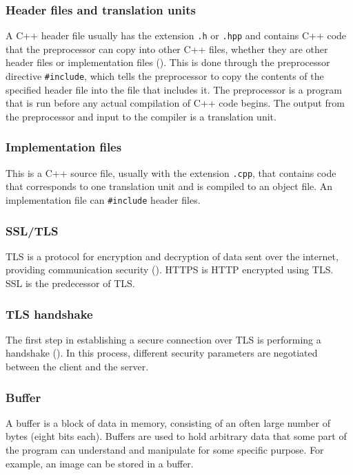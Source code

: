 \documentclass[12pt, a4paper]{article}
\begin{document}
\subsubsection{Header files and translation units}
A C++ header file usually has the extension \texttt{.h} or \texttt{.hpp} and contains C++ code that the preprocessor can copy into other C++ files, whether they are other header files or implementation files (\cite{UnderstandingCompilation}). This is done through the preprocessor directive \texttt{\#include}, which tells the preprocessor to copy the contents of the specified header file into the file that includes it. The preprocessor is a program that is run before any actual compilation of C++ code begins. The output from the preprocessor and input to the compiler is a translation unit.

\subsubsection{Implementation files}
This is a C++ source file, usually with the extension \texttt{.cpp}, that contains code that corresponds to one translation unit and is compiled to an object file. An implementation file can \texttt{\#include} header files.

\subsubsection{SSL/TLS}
TLS is a protocol for encryption and decryption of data sent over the internet, providing communication security (\cite{TlsSpec}). HTTPS is HTTP encrypted using TLS. SSL is the predecessor of TLS.

\subsubsection{TLS handshake}
The first step in establishing a secure connection over TLS is performing a handshake (\cite[][Section 4]{TlsSpec}). In this process, different security parameters are negotiated between the client and the server.

\subsubsection{Buffer}
A buffer is a block of data in memory, consisting of an often large number of bytes (eight bits each). Buffers are used to hold arbitrary data that some part of the program can understand and manipulate for some specific purpose. For example, an image can be stored in a buffer.
\end{document}
